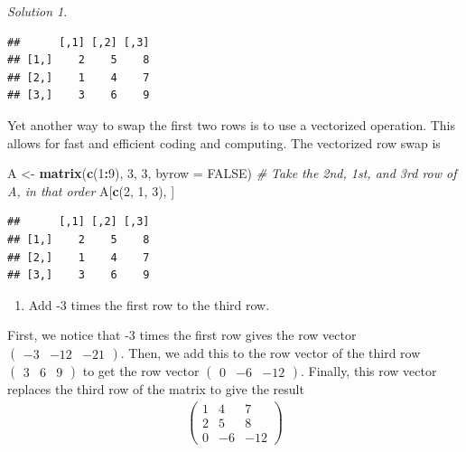 \documentclass[
]{book}
\newenvironment{Shaded}{\begin{snugshade}}{\end{snugshade}}
\newcommand{\CommentTok}[1]{\textcolor[rgb]{0.56,0.35,0.01}{\textit{#1}}}
\newcommand{\DataTypeTok}[1]{\textcolor[rgb]{0.13,0.29,0.53}{#1}}
\newcommand{\DecValTok}[1]{\textcolor[rgb]{0.00,0.00,0.81}{#1}}
\newcommand{\KeywordTok}[1]{\textcolor[rgb]{0.13,0.29,0.53}{\textbf{#1}}}
\newcommand{\NormalTok}[1]{#1}
\newcommand{\OperatorTok}[1]{\textcolor[rgb]{0.81,0.36,0.00}{\textbf{#1}}}
\newcommand{\OtherTok}[1]{\textcolor[rgb]{0.56,0.35,0.01}{#1}}
\newcommand{\StringTok}[1]{\textcolor[rgb]{0.31,0.60,0.02}{#1}}
\providecommand{\tightlist}{%
  \setlength{\itemsep}{0pt}\setlength{\parskip}{0pt}}
\theoremstyle{definition}
\theoremstyle{definition}
\theoremstyle{definition}
\theoremstyle{remark}
\newtheorem*{solution}{Solution}
\begin{document}
\begin{solution}
\begin{verbatim}
##      [,1] [,2] [,3]
## [1,]    2    5    8
## [2,]    1    4    7
## [3,]    3    6    9
\end{verbatim}

Yet another way to swap the first two rows is to use a vectorized operation. This allows for fast and efficient coding and computing. The vectorized row swap is

\begin{Shaded}
\begin{Highlighting}[]
\NormalTok{A <-}\StringTok{ }\KeywordTok{matrix}\NormalTok{(}\KeywordTok{c}\NormalTok{(}\DecValTok{1}\OperatorTok{:}\DecValTok{9}\NormalTok{), }\DecValTok{3}\NormalTok{, }\DecValTok{3}\NormalTok{, }\DataTypeTok{byrow =} \OtherTok{FALSE}\NormalTok{)}
\CommentTok{# Take the 2nd, 1st, and 3rd row of A, in that order}
\NormalTok{A[}\KeywordTok{c}\NormalTok{(}\DecValTok{2}\NormalTok{, }\DecValTok{1}\NormalTok{, }\DecValTok{3}\NormalTok{), ]}
\end{Highlighting}
\end{Shaded}

\begin{verbatim}
##      [,1] [,2] [,3]
## [1,]    2    5    8
## [2,]    1    4    7
## [3,]    3    6    9
\end{verbatim}

\begin{enumerate}
\def\labelenumi{\arabic{enumi})}
\setcounter{enumi}{1}
\tightlist
\item
  Add -3 times the first row to the third row.
\end{enumerate}

First, we notice that -3 times the first row gives the row vector \(\begin{pmatrix} -3 & -12 & -21 \end{pmatrix}\). Then, we add this to the row vector of the third row \(\begin{pmatrix} 3 & 6 & 9 \end{pmatrix}\) to get the row vector \(\begin{pmatrix} 0 & -6 & -12 \end{pmatrix}\). Finally, this row vector replaces the third row of the matrix to give the result
\[
\begin{aligned}
\begin{pmatrix} 1 & 4 & 7 \\ 2 & 5 & 8 \\ 0 & -6 & -12 \end{pmatrix}
\end{aligned}
\]


\end{solution}
\end{document}
